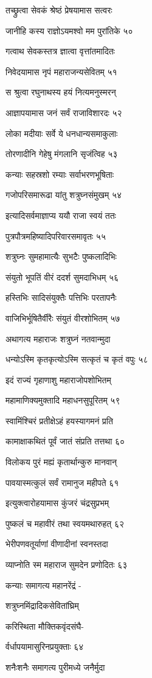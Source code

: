 तच्छ्रुत्वा सेवकं श्रेष्ठं प्रेषयामास सत्वरः

जानीहि कस्य राज्ञोऽयमश्वो मम पुरांतिके ५०

गत्वाथ सेवकस्तत्र ज्ञात्वा वृत्तांतमादितः

निवेदयामास नृपं महाराजन्यसेवितम् ५१

स श्रुत्वा रघुनाथस्य हयं नित्यमनुस्मरन्

आज्ञापयामास जनं सर्वं राजाविशारदः ५२

लोका मदीयाः सर्वे ये धनधान्यसमाकुलाः

तोरणादीनि गेहेषु मंगलानि सृजंत्विह ५३

कन्याः सहस्रशो रम्याः सर्वाभरणभूषिताः

गजोपरिसमारूढा यांतु शत्रुघ्नसंमुखम् ५४

इत्यादिसर्वमाज्ञाप्य ययौ राजा स्वयं ततः

पुत्रपौत्रमहिष्यादिपरिवारसमावृतः ५५

शत्रुघ्नः सुमहामात्यैः सुभटैः पुष्कलादिभिः

संयुतो भूपतिं वीरं ददर्श सुमदाभिधम् ५६

हस्तिभिः सादिसंयुक्तैः पत्तिभिः परतापनैः

वाजिभिर्भूषितैर्वीरैः संयुतं वीरशोभितम् ५७

अथागत्य महाराजः शत्रुघ्नं नतवान्मुदा

धन्योऽस्मि कृतकृत्योऽस्मि सत्कृतं च कृतं वपुः ५८

इदं राज्यं गृहाणाशु महाराजोपशोभितम्

महामाणिक्यमुक्तादि महाधनसुपूरितम् ५९

स्वामिंश्चिरं प्रतीक्षेऽहं हयस्यागमनं प्रति

कामाक्षाकथितं पूर्वं जातं संप्रति तत्तथा ६०

विलोकय पुरं मह्यं कृतार्थान्कुरु मानवान्

पावयास्मत्कुलं सर्वं रामानुज महीपते ६१

इत्युक्त्वारोहयामास कुंजरं चंद्रसुप्रभम्

पुष्कलं च महावीरं तथा स्वयमथारुहत् ६२

भेरीपणवतूर्याणां वीणादीनां स्वनस्तदा

व्याप्नोति स्म महाराज सुमदेन प्रणोदितः ६३

कन्याः समागत्य महानरेंद्रं -

शत्रुघ्नमिंद्रादिकसेवितांघ्रिम्

करिस्थिता मौक्तिकवृंदसंघै-

र्वर्धापयामासुरिनप्रयुक्ताः ६४

शनैःशनैः समागत्य पुरीमध्ये जनैर्मुदा

